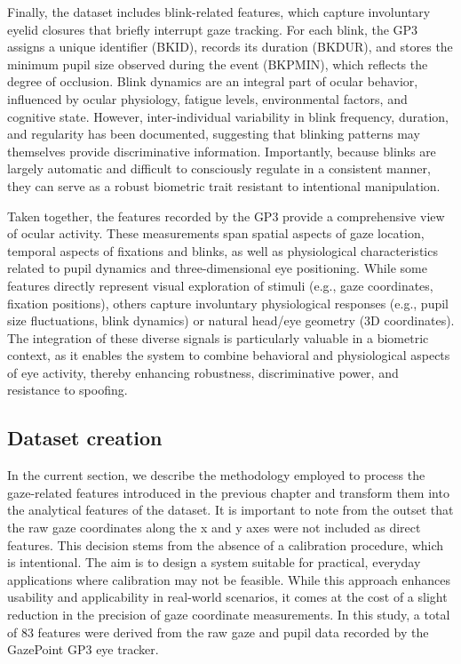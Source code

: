 \documentclass{article}
\begin{document}
Finally, the dataset includes blink-related features, which capture involuntary eyelid closures that briefly interrupt gaze tracking. 
For each blink, the GP3 assigns a unique identifier (BKID), records its duration (BKDUR), and stores the minimum pupil size observed during the event (BKPMIN), which reflects the degree of occlusion. 
Blink dynamics are an integral part of ocular behavior, influenced by ocular physiology, fatigue levels, environmental factors, and cognitive state. 
However, inter-individual variability in blink frequency, duration, and regularity has been documented, suggesting that blinking patterns may themselves provide discriminative information. 
Importantly, because blinks are largely automatic and difficult to consciously regulate in a consistent manner, they can serve as a robust biometric trait resistant to intentional manipulation.

Taken together, the features recorded by the GP3 provide a comprehensive view of ocular activity. 
These measurements span spatial aspects of gaze location, temporal aspects of fixations and blinks, as well as physiological characteristics related to pupil dynamics and three-dimensional eye positioning.
While some features directly represent visual exploration of stimuli (e.g., gaze coordinates, fixation positions), others capture involuntary physiological responses (e.g., pupil size fluctuations, blink dynamics) or natural head/eye geometry (3D coordinates). 
The integration of these diverse signals is particularly valuable in a biometric context, as it enables the system to combine behavioral and physiological aspects of eye activity, thereby enhancing robustness, discriminative power, and resistance to spoofing.

\newpage
\subsection{Dataset creation}

In the current section, we describe the methodology employed to process the gaze-related features introduced in the previous chapter and transform them into the analytical features of the dataset. 
It is important to note from the outset that the raw gaze coordinates along the x and y axes were not included as direct features. 
This decision stems from the absence of a calibration procedure, which is intentional. 
The aim is to design a system suitable for practical, everyday applications where calibration may not be feasible. 
While this approach enhances usability and applicability in real-world scenarios, it comes at the cost of a slight reduction in the precision of gaze coordinate measurements.
In this study, a total of 83 features were derived from the raw gaze and pupil data recorded by the GazePoint GP3 eye tracker. 
\end{document}
